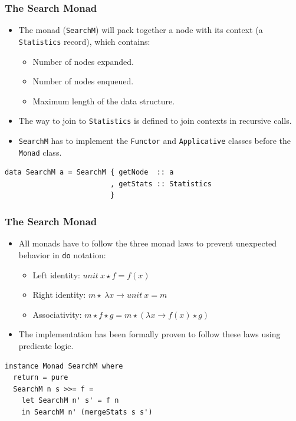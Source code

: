 \documentclass{beamer}
\begin{document}
\begin{frame}[fragile]
  \frametitle{The Search Monad}
  \begin{itemize}
  \item The monad (\texttt{SearchM}) will pack together a node with its context
    (a \texttt{Statistics} record), which contains:
    \begin{itemize}
    \item Number of nodes expanded.
    \item Number of nodes enqueued.
    \item Maximum length of the data structure.
    \end{itemize}
  \item The way to join to \texttt{Statistics} is defined to join contexts in
    recursive calls.
  \item \texttt{SearchM} has to implement the \texttt{Functor} and
    \texttt{Applicative} classes before the \texttt{Monad} class.
  \end{itemize}

  \begin{lstlisting}[style=haskell]
data SearchM a = SearchM { getNode  :: a
                         , getStats :: Statistics
                         }
\end{lstlisting}
\end{frame}

\begin{frame}
  \frametitle{The Search Monad}
  \begin{itemize}
  \item All monads have to follow the three monad laws to prevent unexpected
    behavior in \texttt{do} notation:
    \begin{itemize}
    \item Left identity: $unit \  x \star f = f(x) $
    \item Right identity: $m \star \  \lambda x \rightarrow unit \  x = m$
    \item Associativity: $m \star f \star g = m \star (\lambda x \rightarrow
      f(x) \star g)$
    \end{itemize}
  \item The implementation has been formally proven to follow these laws using
    predicate logic.
  \end{itemize}

\begin{lstlisting}[style=haskell]
instance Monad SearchM where
  return = pure
  SearchM n s >>= f =
    let SearchM n' s' = f n
    in SearchM n' (mergeStats s s')
\end{lstlisting}
\end{frame}
\end{document}

